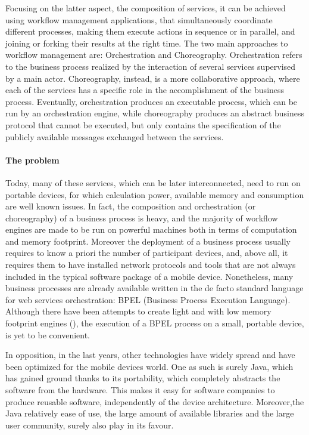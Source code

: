 Focusing on the latter aspect, the composition of services, it can be achieved using workflow management applications, that simultaneously coordinate different processes, making them execute actions in sequence or in parallel, and joining or forking their results at the right time. %
The two main approaches to workflow management are: Orchestration and Choreography.
Orchestration refers to the %
business process realized by the interaction of several services supervised by a main actor. Choreography, instead, is a more collaborative approach, where each of the services has a specific role in the accomplishment of the business process. Eventually, orchestration produces an executable process, which can be run by an orchestration engine, while choreography produces an abstract business protocol that cannot be executed, but only contains the specification of the publicly available messages exchanged between the services.

\paragraph{The problem}
Today, many of these services, which can be later interconnected, need to run on portable devices, for which calculation power, available memory and consumption are well known issues. In fact, the composition and orchestration (or choreography) of a business process is heavy, and the majority of workflow engines are made to be run on powerful machines both in terms of computation and memory footprint. Moreover the deployment of a business process usually requires to know a priori the number of participant devices, and, above all, it requires them to have installed network protocols and tools that are not always included in the typical software package of a mobile device. 
Nonetheless, many business processes are already available written in the de facto standard language for web services orchestration: BPEL (Business Process Execution Language). Although there have been attempts to create light and with low memory footprint engines (\cite{bpelMobileEngineMora,bpelMobileEngineHackmann06sliver:a}), the execution of a BPEL process on a small, portable device, is yet to be convenient.

In opposition, in the last years, other technologies have widely spread and have been optimized for the mobile devices world. One as such is surely Java, which has gained ground thanks to its portability, which completely abstracts the software from the hardware. This makes it easy for software companies to produce reusable software, independently of the device architecture. Moreover,the Java relatively ease of use, the large amount of available libraries and the large user community, surely also play in its favour. 

